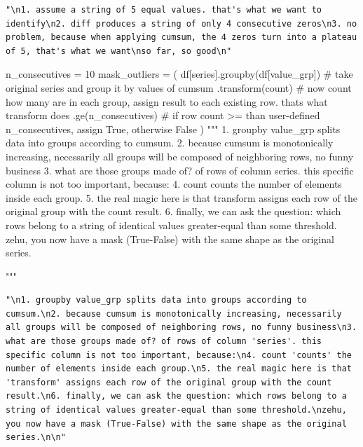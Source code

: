 \documentclass[
  letterpaper,
  DIV=11,
  numbers=noendperiod,
  oneside]{scrreprt}
\newenvironment{Shaded}{\begin{snugshade}}{\end{snugshade}}
\newcommand{\CommentTok}[1]{\textcolor[rgb]{0.37,0.37,0.37}{#1}}
\newcommand{\DecValTok}[1]{\textcolor[rgb]{0.68,0.00,0.00}{#1}}
\newcommand{\NormalTok}[1]{\textcolor[rgb]{0.00,0.23,0.31}{#1}}
\newcommand{\OperatorTok}[1]{\textcolor[rgb]{0.37,0.37,0.37}{#1}}
\newcommand{\StringTok}[1]{\textcolor[rgb]{0.13,0.47,0.30}{#1}}
\begin{document}
\begin{verbatim}
"\n1. assume a string of 5 equal values. that's what we want to identify\n2. diff produces a string of only 4 consecutive zeros\n3. no problem, because when applying cumsum, the 4 zeros turn into a plateau of 5, that's what we want\nso far, so good\n"
\end{verbatim}

\begin{Shaded}
\begin{Highlighting}[]
\NormalTok{n\_consecutives }\OperatorTok{=} \DecValTok{10}
\NormalTok{mask\_outliers }\OperatorTok{=}\NormalTok{ (}
\NormalTok{                 df[}\StringTok{\textquotesingle{}series\textquotesingle{}}\NormalTok{].groupby(df[}\StringTok{\textquotesingle{}value\_grp\textquotesingle{}}\NormalTok{])  }\CommentTok{\# take original series and group it by values of cumsum}
\NormalTok{                             .transform(}\StringTok{\textquotesingle{}count\textquotesingle{}}\NormalTok{)        }\CommentTok{\# now count how many are in each group, assign result to each existing row. that\textquotesingle{}s what transform does}
\NormalTok{                             .ge(n\_consecutives)        }\CommentTok{\# if row count \textgreater{}= than user{-}defined n\_consecutives, assign True, otherwise False}
\NormalTok{                )}
\CommentTok{"""}
\CommentTok{1. groupby value\_grp splits data into groups according to cumsum.}
\CommentTok{2. because cumsum is monotonically increasing, necessarily all groups will be composed of neighboring rows, no funny business}
\CommentTok{3. what are those groups made of? of rows of column \textquotesingle{}series\textquotesingle{}. this specific column is not too important, because:}
\CommentTok{4. count \textquotesingle{}counts\textquotesingle{} the number of elements inside each group.}
\CommentTok{5. the real magic here is that \textquotesingle{}transform\textquotesingle{} assigns each row of the original group with the count result.}
\CommentTok{6. finally, we can ask the question: which rows belong to a string of identical values greater{-}equal than some threshold.}
\CommentTok{zehu, you now have a mask (True{-}False) with the same shape as the original series.}

\CommentTok{"""}
\end{Highlighting}
\end{Shaded}

\begin{verbatim}
"\n1. groupby value_grp splits data into groups according to cumsum.\n2. because cumsum is monotonically increasing, necessarily all groups will be composed of neighboring rows, no funny business\n3. what are those groups made of? of rows of column 'series'. this specific column is not too important, because:\n4. count 'counts' the number of elements inside each group.\n5. the real magic here is that 'transform' assigns each row of the original group with the count result.\n6. finally, we can ask the question: which rows belong to a string of identical values greater-equal than some threshold.\nzehu, you now have a mask (True-False) with the same shape as the original series.\n\n"
\end{verbatim}
\end{document}
